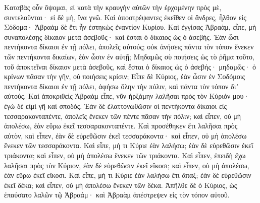 {Καταβὰς οὖν ὄψομαι, εἰ κατὰ τὴν κραυγὴν αὐτῶν τὴν ἐρχομένην πρὸς μὲ, συντελοῦνται· εἰ δὲ μὴ, ἵνα γνῶ.
Καὶ ἀποστρέψαντες ἐκεῖθεν οἱ ἄνδρες, ἦλθον εἰς Σόδομα· Ἁβραὰμ δὲ ἔτι ἦν ἑστηκὼς ἐναντίον Κυρίου.
Καὶ ἐγγίσας Ἁβραὰμ, εἶπε, μὴ συναπολέσῃς δίκαιον μετὰ ἀσεβοῦς· καὶ ἔσται ὁ δίκαιος ὡς ὁ ἀσεβής.
Ἐὰν ὦσι πεντήκοντα δίκαιοι ἐν τῇ πόλει, ἀπολεῖς αὐτούς; οὐκ ἀνήσεις πάντα τὸν τόπον ἕνεκεν τῶν πεντήκοντα δικαίων, ἐὰν ὦσιν ἐν αὐτῇ;
Μηδαμῶς σὺ ποιήσεις ὡς τὸ ῥῆμα τοῦτο, τοῦ ἀποκτεῖναι δίκαιον μετὰ ἀσεβοῦς, καὶ ἔσται ὁ δίκαιος ὡς ὁ ἀσεβής· μηδαμῶς· ὁ κρίνων πᾶσαν τὴν γῆν, οὐ ποιήσεις κρίσιν;
Εἶπε δὲ Κύριος, ἐὰν ὦσιν ἐν Σοδόμοις πεντήκοντα δίκαιοι ἐν τῇ πόλει, ἀφήσω ὅλην τὴν πόλιν, καὶ πάντα τὸν τόπον διʼ αὐτούς.
Καὶ ἀποκριθεὶς Ἁβραὰμ εἶπε, νῦν ἠρξάμην λαλῆσαι πρὸς τὸν Κύριόν μου· ἐγὼ δὲ εἰμὶ γῆ καὶ σποδός.
Ἐὰν δὲ ἐλαττονωθῶσιν οἱ πεντήκοντα δίκαιοι εἰς τεσσαρακονταπέντε, ἀπολεῖς ἕνεκεν τῶν πέντε πᾶσαν τὴν πόλιν; καὶ εἶπεν, οὐ μὴ ἀπολέσω, ἐὰν εὕρω ἐκεῖ τεσσαρακονταπέντε.
Καὶ προσέθηκεν ἔτι λαλῆσαι πρὸς αὐτὸν, καὶ εἶπεν, ἐὰν δὲ εὑρεθῶσιν ἐκεῖ τεσσαράκοντα· καὶ εἶπεν, οὐ μὴ ἀπολέσω ἕνεκεν τῶν τεσσαράκοντα.
Καὶ εἶπε, μή τι Κύριε ἐὰν λαλήσω; ἐὰν δὲ εὑρεθῶσιν ἐκεῖ τριάκοντα; καὶ εἶπεν, οὐ μὴ ἀπολέσω ἕνεκεν τῶν τριάκοντα.
Καὶ εἶπεν, ἐπειδὴ ἔχω λαλῆσαι πρὸς τὸν Κύριον, ἐὰν δὲ εὑρεθῶσιν ἐκεῖ εἴκοσι; καὶ εἶπεν, οὐ μὴ ἀπολέσω, ἐὰν εὕρω ἐκεῖ εἴκοσι.
Καὶ εἶπε, μή τι Κύριε ἐὰν λαλήσω ἔτι ἅπαξ; ἐὰν δὲ εὑρεθῶσιν ἐκεῖ δέκα; καὶ εἶπεν, οὐ μὴ ἀπολέσω ἕνεκεν τῶν δέκα.
Ἀπῆλθε δὲ ὁ Κύριος, ὡς ἐπαύσατο λαλῶν τῷ Ἁβραάμ· καὶ Ἁβραὰμ ἀπέστρεψεν εἰς τὸν τόπον αὐτοῦ.

}
